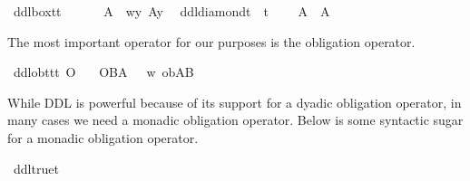 \begin{isabellebody}
\begin{isamarkuptext}
\end{isamarkuptext}\isamarkuptrue%
\isamarkupfalse%
\ ddlbox{\isacharcolon}{\isacharcolon}{\isachardoublequoteopen}t{\isasymRightarrow}t{\isachardoublequoteclose}\ {\isacharparenleft}{\isachardoublequoteopen}{\isasymbox}{\isachardoublequoteclose}{\isacharparenright}\ \isanewline
\ \ \ {\isachardoublequoteopen}{\isasymbox}\ A\ {\isasymequiv}\ {\isasymlambda}w{\isachardot}{\isasymforall}y{\isachardot}\ A{\isacharparenleft}y{\isacharparenright}{\isachardoublequoteclose}\ \isanewline
{}\isamarkupfalse%
\ ddldiamond{\isacharcolon}{\isacharcolon}{\isachardoublequoteopen}t\ {\isasymRightarrow}\ t{\isachardoublequoteclose}\ {\isacharparenleft}{\isachardoublequoteopen}{\isasymdiamond}{\isachardoublequoteclose}{\isacharparenright}\isanewline
\ \ \ {\isachardoublequoteopen}{\isasymdiamond}A\ {\isasymequiv}\ \isactrlbold {\isasymnot}{\isacharparenleft}{\isasymbox}{\isacharparenleft}\isactrlbold {\isasymnot}A{\isacharparenright}{\isacharparenright}{\isachardoublequoteclose}%
\begin{isamarkuptext}%
The most important operator for our purposes is the obligation operator.%
\end{isamarkuptext}\isamarkuptrue%
\isamarkupfalse%
\ ddlob{\isacharcolon}{\isacharcolon}{\isachardoublequoteopen}t{\isasymRightarrow}t{\isasymRightarrow}t{\isachardoublequoteclose}\ {\isacharparenleft}{\isachardoublequoteopen}O{\isacharbraceleft}{\isacharunderscore}{\isacharbar}{\isacharunderscore}{\isacharbraceright}{\isachardoublequoteclose}{\isacharparenright}\isanewline
\ \ \ {\isachardoublequoteopen}O{\isacharbraceleft}B{\isacharbar}A{\isacharbraceright}\ {\isasymequiv}\ {\isasymlambda}\ w{\isachardot}\ ob{\isacharparenleft}A{\isacharparenright}{\isacharparenleft}B{\isacharparenright}{\isachardoublequoteclose}\isanewline
%
\isanewline
%
\begin{isamarkuptext}%
While DDL is powerful because of its support for a dyadic obligation operator, in many cases 
we need a monadic obligation operator. Below is some syntactic sugar for a monadic obligation operator.%
\end{isamarkuptext}\isamarkuptrue%
\isamarkupfalse%
\ ddltrue{\isacharcolon}{\isacharcolon}{\isachardoublequoteopen}t{\isachardoublequoteclose}\ {\isacharparenleft}{\isachardoublequoteopen}\isactrlbold {\isasymtop}{\isachardoublequoteclose}{\isacharparenright}\isanewline

\end{isabellebody}
